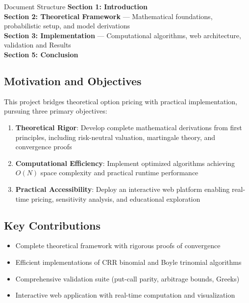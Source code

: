 \documentclass[10pt,twocolumn]{article}
\begin{document}
\begin{keybox}{Document Structure}
\textbf{Section 1: Introduction}\\
\textbf{Section 2: Theoretical Framework} --- Mathematical foundations, probabilistic setup, and model derivations\\
\textbf{Section 3: Implementation} --- Computational algorithms, web architecture, validation and Results\\
\textbf{Section 5: Conclusion}
\end{keybox}

\subsection{Motivation and Objectives}

This project bridges theoretical option pricing with practical implementation, pursuing three primary objectives:

\begin{enumerate}[leftmargin=*,itemsep=3pt]
    \item \textbf{Theoretical Rigor}: Develop complete mathematical derivations from first principles, including risk-neutral valuation, martingale theory, and convergence proofs
    \item \textbf{Computational Efficiency}: Implement optimized algorithms achieving $O(N)$ space complexity and practical runtime performance
    \item \textbf{Practical Accessibility}: Deploy an interactive web platform enabling real-time pricing, sensitivity analysis, and educational exploration
\end{enumerate}

\subsection{Key Contributions}

\begin{resultbox}
\begin{itemize}[itemsep=2pt]
    \item Complete theoretical framework with rigorous proofs of convergence
    \item Efficient implementations of CRR binomial and Boyle trinomial algorithms
    \item Comprehensive validation suite (put-call parity, arbitrage bounds, Greeks)
    \item Interactive web application with real-time computation and visualization
\end{itemize}
\end{resultbox}
\end{document}
